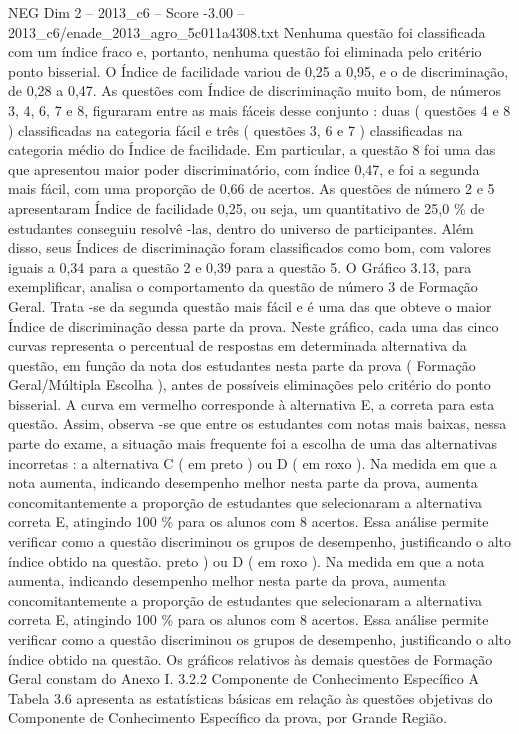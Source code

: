 \begin{textsample}{NEG Dim 2 – 2013\_c6 – Score -3.00 – 2013\_c6/enade\_2013\_agro\_5c011a4308.txt}
Nenhuma questão foi classificada com um índice fraco e, portanto, nenhuma questão foi eliminada pelo critério ponto bisserial.
O Índice de facilidade variou de 0,25 a 0,95, e o de discriminação, de 0,28 a 0,47.
As questões com Índice de discriminação muito bom, de números 3, 4, 6, 7 e 8, figuraram entre as mais fáceis desse conjunto : duas ( questões 4 e 8 ) classificadas na categoria fácil e três ( questões 3, 6 e 7 ) classificadas na categoria médio do Índice de facilidade.
Em particular, a questão 8 foi uma das que apresentou maior poder discriminatório, com índice 0,47, e foi a segunda mais fácil, com uma proporção de 0,66 de acertos.
As questões de número 2 e 5 apresentaram Índice de facilidade 0,25, ou seja, um quantitativo de 25,0 \% de estudantes conseguiu resolvê -las, dentro do universo de participantes.
Além disso, seus Índices de discriminação foram classificados como bom, com valores iguais a 0,34 para a questão 2 e 0,39 para a questão 5.
O Gráfico 3.13, para exemplificar, analisa o comportamento da questão de número 3 de Formação Geral.
Trata -se da segunda questão mais fácil e é uma das que obteve o maior Índice de discriminação dessa parte da prova.
Neste gráfico, cada uma das cinco curvas representa o percentual de respostas em determinada alternativa da questão, em função da nota dos estudantes nesta parte da prova ( Formação Geral/Múltipla Escolha ), antes de possíveis eliminações pelo critério do ponto bisserial.
A curva em vermelho corresponde à alternativa E, a correta para esta questão.
Assim, observa -se que entre os estudantes com notas mais baixas, nessa parte do exame, a situação mais frequente foi a escolha de uma das alternativas incorretas : a alternativa C ( em preto ) ou D ( em roxo ).
Na medida em que a nota aumenta, indicando desempenho melhor nesta parte da prova, aumenta concomitantemente a proporção de estudantes que selecionaram a alternativa correta E, atingindo 100 \% para os alunos com 8 acertos.
Essa análise permite verificar como a questão discriminou os grupos de desempenho, justificando o alto índice obtido na questão. preto ) ou D ( em roxo ).
Na medida em que a nota aumenta, indicando desempenho melhor nesta parte da prova, aumenta concomitantemente a proporção de estudantes que selecionaram a alternativa correta E, atingindo 100 \% para os alunos com 8 acertos.
Essa análise permite verificar como a questão discriminou os grupos de desempenho, justificando o alto índice obtido na questão.
Os gráficos relativos às demais questões de Formação Geral constam do Anexo I. 3.2.2 Componente de Conhecimento Específico A Tabela 3.6 apresenta as estatísticas básicas em relação às questões objetivas do Componente de Conhecimento Específico da prova, por Grande Região.

\end{textsample}
